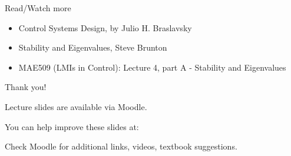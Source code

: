\documentclass{beamer}
\begin{document}
\begin{frame}{Read/Watch more}

\begin{itemize}
\item Control Systems Design, by Julio H. Braslavsky 

\item Stability and Eigenvalues, Steve Brunton 

\item MAE509 (LMIs in Control): Lecture 4, part A - Stability and Eigenvalues  

\end{itemize}

\end{frame}



\begin{frame}{Thank you!}
\centerline{Lecture slides are available via Moodle.}
\bigskip
\centerline{You can help improve these slides at:}
\centerline{\mygit}
\bigskip
\centerline{Check Moodle for additional links, videos, textbook suggestions.}
\bigskip

\centerline{\textcolor{black}{}}
\end{frame}
\end{document}
